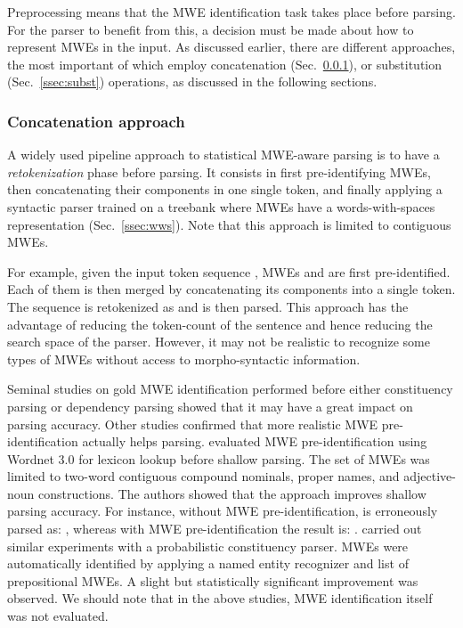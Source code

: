 \documentclass[output=paper]{LSP/langsci}
\begin{document}
Preprocessing means that the MWE identification task takes place before parsing. For the parser to benefit from this, a decision must be made about how to represent MWEs in the input. As discussed earlier, there are different approaches, the most important of which  employ concatenation (Sec.~\ref{ssec:concat}), or substitution (Sec.~\ref{ssec:subst}) operations, as discussed in the following sections.

\subsubsection{Concatenation approach}
\label{ssec:concat}

A widely used pipeline approach to statistical MWE-aware parsing is to have a \emph{retokenization} phase before parsing. It consists in first pre-identifying MWEs, then concatenating their components in one single token, and finally applying  a syntactic parser trained on a treebank where MWEs have a words-with-spaces representation (Sec.~\ref{ssec:wws}). Note that this approach is limited to contiguous MWEs. 

For example, given the input token sequence , MWEs  and  are first pre-identified. Each of them is then merged by concatenating its components into a single token. The sequence is retokenized as  and is then parsed.
This approach has the advantage of reducing the token-count of the sentence and hence reducing the search space of the parser. However, it may not be realistic to recognize some types of MWEs without access to morpho-syntactic information.

Seminal studies 
on gold MWE identification performed before either consti\-tuency parsing \citep{arun05} or dependency parsing \citep{nivre04,eryigit:2011:mes:2206359.2206365} showed that it may have a great impact on parsing accuracy.
Other studies confirmed that more realistic MWE pre-identification actually helps parsing. 
\citet{korkontzelosetal2010} evaluated MWE pre-identification using Wordnet 3.0 for lexicon lookup before shallow parsing. The set of MWEs was limited to two-word contiguous compound nominals, proper names, and adjective-noun constructions. The authors showed that the approach improves shallow parsing accuracy. For instance, 
without  MWE pre-identification,
 is erroneously parsed as: , whereas with MWE pre-identification the result is: . \citet{cafferkey07} carried out similar experiments with a probabilistic constituency parser. MWEs were automatically identified by applying a named entity recognizer and list of prepositional MWEs. A slight but statistically significant improvement was observed. We should note that in the above studies, MWE identification itself was not evaluated. 
\end{document}

